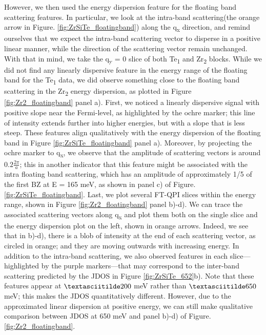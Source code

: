 However, we then used the energy dispersion feature for the floating band scattering features. In particular, we look at the intra-band scattering(the orange arrow in Figure. \ref{fig:ZrSiTe_floatingband}) along the q\textsubscript{x} direction, and remind ourselves that we expect the intra-band scattering vector to disperse in a positive linear manner, while the direction of the scattering vector remain unchanged. With that in mind, we take the q\textsubscript{y} = 0 slice of both Te\textsubscript{1} and Zr\textsubscript{2} blocks. While we did not find any linearly dispersive feature in the energy range of the floating band for the Te\textsubscript{1} data, we did observe something close to the floating band scattering in the Zr\textsubscript{2} energy dispersion, as plotted in Figure \ref{fig:Zr2_floatingband} panel a). First, we noticed a linearly dispersive signal with positive slope near the Fermi-level, as highlighted by the ochre marker; this line of intensity extends further into higher energies, but with a slope that is less steep. These features align qualitatively with the energy dispersion of the floating band in Figure \ref{fig:ZrSiTe_floatingband} panel a). Moreover, by projecting the ochre marker to q\textsubscript{x}, we observe that the amplitude of scattering vectors is around $0.2 \frac{2\pi}{a}$; this in another indicator that this feature might be associated with the intra floating band scattering, which has an amplitude of approximately 1/5 of the first \ac{BZ} at E = 165 meV, as shown in panel c) of Figure. \ref{fig:ZrSiTe_floatingband}. Last, we plot several FT-QPI slices within the energy range, shown in Figure \ref{fig:Zr2_floatingband} panel b)-d). We can trace the associated scattering vectors along q\textsubscript{x} and plot them both on the single slice and the energy dispersion plot on the left, shown in orange arrows. Indeed, we see that in b)-d), there is a blob of intensity at the end of each scattering vector, as circled in orange; and they are moving outwards with increasing energy. In addition to the intra-band scattering, we also observed features in each slice—highlighted by the purple markers—that may correspond to the inter-band scattering predicted by the \ac{JDOS} in Figure \ref{fig:ZrSiTe_652}b). Note that these features appear at $\textasciitilde 200$ meV rather than $\textasciitilde 650$ meV; this makes the \ac{JDOS} quantitatively different. However, due to the approximated linear dispersion at positive energy, we can still make qualitative comparison between \ac{JDOS} at 650 meV and panel b)-d) of Figure. \ref{fig:Zr2_floatingband}.



